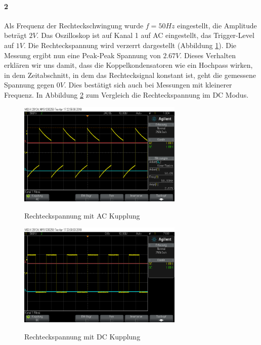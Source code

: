 \documentclass[a4paper]{article}
\begin{document}
    \paragraph{2}
    Als Frequenz der Rechteckschwingung wurde $f=50\si{Hz}$ eingestellt, die Amplitude beträgt $2\si{V}$. Das Oszilloskop ist auf Kanal 1 auf AC eingestellt, das Trigger-Level auf $1\si{V}$. Die Rechteckspannung wird verzerrt dargestellt (Abbildung \ref{fig:rechteckAC}). Die Messung ergibt nun eine Peak-Peak Spannung von $2.67\si{V}$. Dieses Verhalten erklären wir uns damit, dass die Koppelkondensatoren wie ein Hochpass wirken, in dem Zeitabschnitt, in dem das Rechtecksignal konstant ist, geht die gemessene Spannung gegen $0\si{V}$. Dies bestätigt sich auch bei Messungen mit kleinerer Frequenz. In Abbildung \ref{fig:rechteckDC}
    zum Vergleich die Rechteckspannung im DC Modus.
    \begin{figure}
    \caption{Rechteckspannung mit AC Kupplung}
    \centering
    \includegraphics[width=0.7\textwidth]{rechteckAC}
    \label{fig:rechteckAC}
    \end{figure}
    \begin{figure}
    \caption{Rechteckspannung mit DC Kupplung}
    \centering
    \includegraphics[width=0.7\textwidth]{rechteckDC}
    \label{fig:rechteckDC}
    \end{figure}
    
\end{document}
